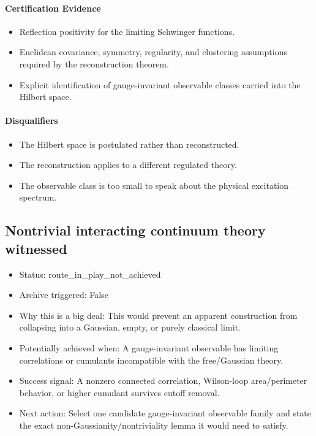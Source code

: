\documentclass[11pt]{article}
\begin{document}
\paragraph{Certification Evidence}

\begin{itemize}
\item Reflection positivity for the limiting Schwinger functions.
\item Euclidean covariance, symmetry, regularity, and clustering assumptions required by the reconstruction theorem.
\item Explicit identification of gauge-invariant observable classes carried into the Hilbert space.
\end{itemize}

\paragraph{Disqualifiers}

\begin{itemize}
\item The Hilbert space is postulated rather than reconstructed.
\item The reconstruction applies to a different regulated theory.
\item The observable class is too small to speak about the physical excitation spectrum.
\end{itemize}

\subsection*{Nontrivial interacting continuum theory witnessed}

\begin{itemize}
\item Status: route\_in\_play\_not\_achieved
\item Archive triggered: False
\item Why this is a big deal: This would prevent an apparent construction from collapsing into a Gaussian, empty, or purely classical limit.
\item Potentially achieved when: A gauge-invariant observable has limiting correlations or cumulants incompatible with the free/Gaussian theory.
\item Success signal: A nonzero connected correlation, Wilson-loop area/perimeter behavior, or higher cumulant survives cutoff removal.
\item Next action: Select one candidate gauge-invariant observable family and state the exact non-Gaussianity/nontriviality lemma it would need to satisfy.
\end{itemize}
\end{document}
